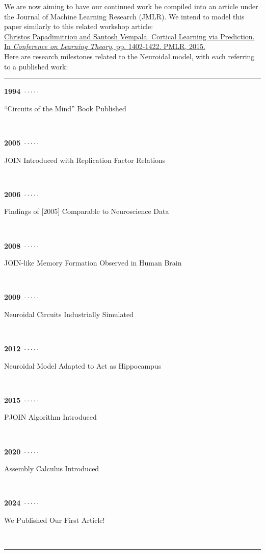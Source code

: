 \documentclass{article}
\begin{document}
We are now aiming to have our continued work be compiled into an article under the Journal of Machine Learning Research (JMLR). We intend to model this paper similarly to this related workshop article: \\

\noindent 
\href{https://proceedings.mlr.press/v40/Papadimitriou15.html}{Christos Papadimitriou and Santosh Vempala. Cortical Learning via Prediction. In \textit{Conference on Learning Theory}, pp. 1402-1422. PMLR, 2015.} \\

Here are research milestones related to the Neuroidal model, with each referring to a published work:

\vspace{-2mm}

\newcommand\ytl[2]{
\parbox[b]{8em}{\hfill{\color{black}\bfseries #1}~$\cdot\cdot\cdot\cdot\cdot$~}\makebox[0pt][c]{$\bullet$}\vrule\quad \parbox[c]{9cm}{\vspace{7pt}\color{black}\raggedright #2\\[7pt]}\\[-3pt]} 

\begin{table}[h]
\centering
\begin{minipage}[t]{1.\linewidth}
\color{red}
\rule{\linewidth}{1pt}
\ytl{1994}{``Circuits of the Mind'' Book Published}
\ytl{2005}{JOIN Introduced with Replication Factor Relations \cite{valiant2005}}
\ytl{2006}{Findings of [2005] Comparable to Neuroscience Data}
\ytl{2008}{JOIN-like Memory Formation Observed in Human Brain}
\ytl{2009}{Neuroidal Circuits Industrially Simulated}
\ytl{2012}{Neuroidal Model Adapted to Act as Hippocampus}
\ytl{2015}{PJOIN Algorithm Introduced \cite{papadim2015}}
\ytl{2020}{Assembly Calculus Introduced \cite{papadim2020}}
\ytl{2024}{We Published Our First Article! \cite{perrine2024}}
\bigskip
\rule{\linewidth}{1pt}%
\end{minipage}%
\end{table}

\newpage

%
\end{document}
